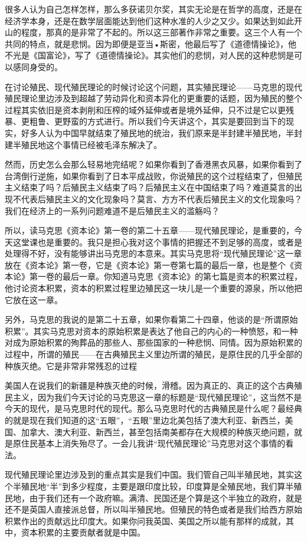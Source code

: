 \documentclass[UTF8, 12pt, a4paper]{ctexrep}
\begin{document}
很多人认为自己怎样怎样，那么多获诺贝尔奖，其实无论是在哲学的高度，还是在经济学本身，还是在数学层面能达到他们这种水准的人少之又少。如果达到如此开山的程度，那真的是非常了不起的。所以这三部著作非常之重要。这三个人有一个共同的特点，就是悲悯。因为即便是亚当•斯密，他最后写了《道德情操论》，他不光是《国富论》，写了《道德情操论》。其实他们的悲悯，对人民的这种悲悯是可以感同身受的。

在讨论殖民、现代殖民理论的时候讨论这个问题，其实殖民理论——马克思的现代殖民理论里边涉及到超越了劳动异化和资本异化的更重要的话题，因为殖民的整个过程其实依旧是资本剥削和压榨的域外延伸或者是境外延伸，只不过是它以更残暴、更粗鲁、更野蛮的方式进行。所以我们今天讲这个，其实是要回到当下的现实，好多人认为中国早就结束了殖民地的统治，我们原来是半封建半殖民地，半封建半殖民地这个事情已经被毛泽东解决了。

然而，历史怎么会那么轻易地完结呢？如果你看到了香港黑衣风暴，如果你看到了台湾倒行逆施，如果你看到了日本平成战败，你说殖民的这个过程结束了，但殖民主义结束了吗？后殖民主义结束了吗？后殖民主义在中国结束了吗？难道莫言的出现不代表后殖民主义的文化现象吗？莫言、方方不代表后殖民主义的文化现象吗？我们在经济上的一系列问题难道不是后殖民主义的滥觞吗？

所以，读马克思《资本论》第一卷的第二十五章——现代殖民理论，是重要的，今天这堂课也是重要的。我只是担心我对这个事情的把握还不到足够的高度，或者是处理得不好，没有能够讲出马克思的本意来。其实马克思将“现代殖民理论”这一章放在《资本论》第一卷，它是《资本论》第一卷第七篇的最后一章，也是整个《资本论》第一卷的最后一章。你知道马克思《资本论》的第七篇是资本的积累过程，他讨论资本积累，资本的积累过程里边殖民这一块儿是一个重要的源泉，所以他把它放在这一章。

另外，马克思的我说的是第二十五章，如果你看第二十四章，他谈的是“所谓原始积累”。其实马克思对资本的原始积累是表达了他自己的内心的一种愤怒，和一种对成为原始积累的殉葬品的那些人、那些国家的一种悲悯、同情。因为原始积累的过程中，所谓的殖民——在古典殖民主义里边所谓的殖民，是原住民的几乎全部的种族灭绝。它是非常非常残忍的过程

美国人在说我们的新疆是种族灭绝的时候，滑稽。因为真正的、真正的这个古典殖民主义，因为我们今天讨论的马克思这一章的标题是“现代殖民理论”，这当然不是今天的现代，是马克思时代的现代。那么马克思时代的古典殖民是什么呢？最经典的就是现在我们知道的这“五眼”，“五眼”里边北美包括了澳大利亚、新西兰，美国、加拿大、澳大利亚、新西兰，甚至包括南美都存在大规模的种族灭绝问题，就是原住民基本上消失殆尽了。一会儿我讲“现代殖民理论”马克思对这个事情的看法。

现代殖民理论里边涉及到的重点其实是我们中国。我们管自己叫半殖民地，其实这个半殖民地“半”到多少程度，主要是跟印度比较，印度算是全殖民地，我们算半殖民地，由于我们还有一个政府嘛。满清、民国还是个算是这个半独立的政府，就是还不是英国人直接派总督，所以叫半殖民地。但殖民的特色或者是我们给西方原始积累作出的贡献远比印度大。如果你问我英国、美国之所以能有那样的成就，其中，资本积累的主要贡献者就是中国。
\end{document}
